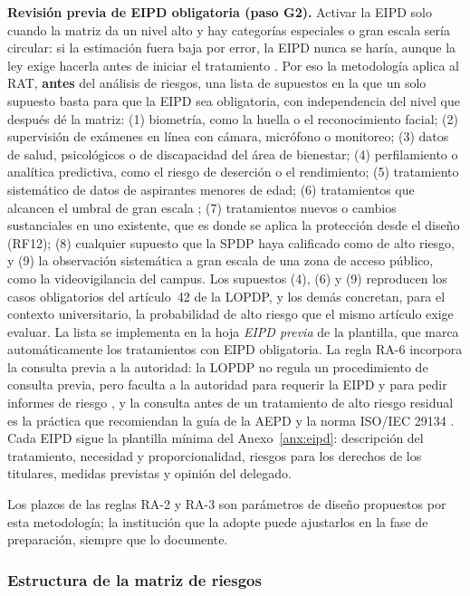 \textbf{Revisión previa de EIPD obligatoria (paso G2).} Activar la EIPD solo cuando la matriz da un nivel alto y hay categorías especiales o gran escala sería circular: si la estimación fuera baja por error, la EIPD nunca se haría, aunque la ley exige hacerla antes de iniciar el tratamiento \cite[art.~42]{lopdp2021}. Por eso la metodología aplica al RAT, \textbf{antes} del análisis de riesgos, una lista de supuestos en la que un solo supuesto basta para que la EIPD sea obligatoria, con independencia del nivel que después dé la matriz: (1) biometría, como la huella o el reconocimiento facial; (2) supervisión de exámenes en línea con cámara, micrófono o monitoreo; (3) datos de salud, psicológicos o de discapacidad del área de bienestar; (4) perfilamiento o analítica predictiva, como el riesgo de deserción o el rendimiento; (5) tratamiento sistemático de datos de aspirantes menores de edad; (6) tratamientos que alcancen el umbral de gran escala \cite{spdp2026granescala}; (7) tratamientos nuevos o cambios sustanciales en uno existente, que es donde se aplica la protección desde el diseño (RF12); (8) cualquier supuesto que la SPDP haya calificado como de alto riesgo, y (9) la observación sistemática a gran escala de una zona de acceso público, como la videovigilancia del campus. Los supuestos (4), (6) y (9) reproducen los casos obligatorios del artículo~42 de la LOPDP, y los demás concretan, para el contexto universitario, la probabilidad de alto riesgo que el mismo artículo exige evaluar. La lista se implementa en la hoja \textit{EIPD previa} de la plantilla, que marca automáticamente los tratamientos con EIPD obligatoria. La regla RA-6 incorpora la consulta previa a la autoridad: la LOPDP no regula un procedimiento de consulta previa, pero faculta a la autoridad para requerir la EIPD y para pedir informes de riesgo \cite[arts.~9, lit.~c, y 42]{lopdp2021}, y la consulta antes de un tratamiento de alto riesgo residual es la práctica que recomiendan la guía de la AEPD y la norma ISO/IEC 29134 \cite{aepd2021riesgo,iso29134_2023}. Cada EIPD sigue la plantilla mínima del Anexo~\ref{anx:eipd}: descripción del tratamiento, necesidad y proporcionalidad, riesgos para los derechos de los titulares, medidas previstas y opinión del delegado.

Los plazos de las reglas RA-2 y RA-3 son parámetros de diseño propuestos por esta metodología; la institución que la adopte puede ajustarlos en la fase de preparación, siempre que lo documente.

\subsubsection{Estructura de la matriz de riesgos}

